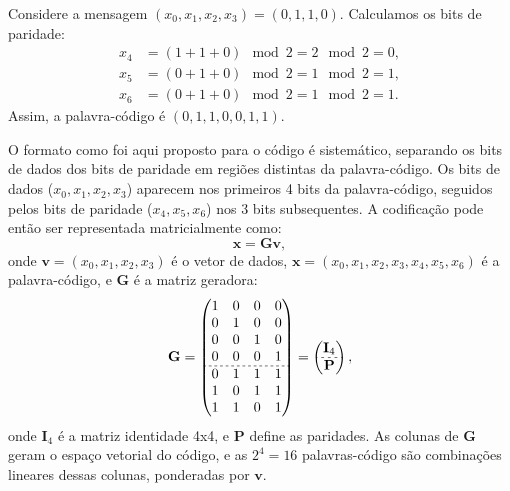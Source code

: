 \begin{example}
Considere a mensagem $(x_0, x_1, x_2, x_3) = (0,1,1,0)$. Calculamos os bits de paridade:
\begin{subequations}
  \begin{align}
    x_4 &= (1 + 1 + 0) \mod 2 = 2 \mod 2 = 0,\\
    x_5 &= (0 + 1 + 0) \mod 2 = 1 \mod 2 = 1,\\
    x_6 &= (0 + 1 + 0) \mod 2 = 1 \mod 2 = 1.
  \end{align}
\end{subequations}
Assim, a palavra-código é $(0,1,1,0,0,1,1)$.
\end{example}

O formato como foi aqui proposto para o código é sistemático, separando os bits
de dados dos bits de paridade em regiões distintas da palavra-código. Os bits
de dados ($x_0, x_1, x_2, x_3$) aparecem nos primeiros 4 bits da
palavra-código, seguidos pelos bits de paridade ($x_4, x_5, x_6$) nos 3 bits
subsequentes. A codificação pode então ser representada matricialmente como:
\begin{equation}
\mathbf{x} = \mathbf{G} \mathbf{v},
\end{equation}
onde $\mathbf{v} = (x_0, x_1, x_2, x_3)$ é o vetor de dados, 
$\mathbf{x} = (x_0, x_1, x_2, x_3, x_4, x_5, x_6)$ é a palavra-código, e 
$\mathbf{G}$ é a matriz geradora:
\begin{equation}
\mathbf{G} = \begin{pmatrix}
1 & 0 & 0 & 0 \\
0 & 1 & 0 & 0 \\
0 & 0 & 1 & 0 \\
0 & 0 & 0 & 1 \\
\hdashline[2pt/2pt]
0 & 1 & 1 & 1 \\
1 & 0 & 1 & 1 \\
1 & 1 & 0 & 1
\end{pmatrix} = \begin{pmatrix} \mathbf{I}_4 \\ \hdashline[2pt/2pt] \mathbf{P} \end{pmatrix},
\end{equation}
onde $\mathbf{I}_4$ é a matriz identidade 4x4, e
$\mathbf{P}$ define as paridades. As colunas de $\mathbf{G}$ geram o espaço vetorial do código, 
e as $2^4 = 16$ palavras-código são combinações lineares dessas colunas, ponderadas por $\mathbf{v}$.

